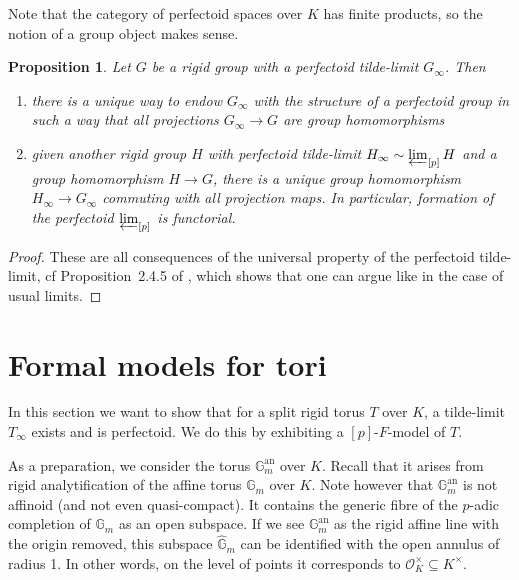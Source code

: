 \documentclass[10pt,oneside]{amsart}
\newtheorem{proposition}[theorem]{Proposition}
\theoremstyle{definition}
\begin{document}
			Note that the category of perfectoid spaces over $K$ has finite products, so the notion of a group object makes sense. 
	
	\begin{proposition}\label{perfectoid tilde-limit is perfectoid group in a functorial way}
		Let $G$ be a rigid group with a perfectoid tilde-limit $G_\infty$. Then
		\begin{enumerate}
		\item  there is a unique way to endow $G_\infty$ with the structure of a perfectoid group in such a way that all projections $G_\infty\rightarrow G$ are group homomorphisms
		\item given another rigid group $H$ with perfectoid tilde-limit $H_\infty\sim\varprojlim_{[p]}H$ and a group homomorphism $H\rightarrow G$, there is a unique group homomorphism $H_\infty\rightarrow G_\infty$
		commuting with all projection maps. In particular, formation of the perfectoid $\varprojlim_{[p]}$ is functorial.
	\end{enumerate}
	\end{proposition}
	\begin{proof}
		These are all consequences of the universal property of the perfectoid tilde-limit, cf Proposition~2.4.5 of \cite{SW}, which shows that one can argue like in the case of usual limits.
	\end{proof}


	\section{Formal models for tori}
	
	In this section we want to show that for a split rigid torus $T$ over $K$, a tilde-limit $T_\infty$ exists and is perfectoid. We do this by exhibiting a $[p]$-$F$-model of $T$.
	
	As a preparation, we consider the torus $\mathbb G_m^{\operatorname{an}}$ over $K$. Recall that it arises from rigid analytification of the affine torus $\mathbb G_m$ over $K$. Note however that $\mathbb G_m^{\operatorname{an}}$ is not affinoid (and not even quasi-compact). It contains the generic fibre of the $p$-adic completion of $\mathbb G_m$ as an open subspace. If we see $\mathbb G_m^{\operatorname{an}}$ as the rigid affine line with the origin removed, this subspace $\widehat{\mathbb G}_m$ can be identified with the open annulus of radius 1. In other words, on the level of points it corresponds to $\mathcal O_K^\times \subseteq K^\times$.
	
\end{document}
